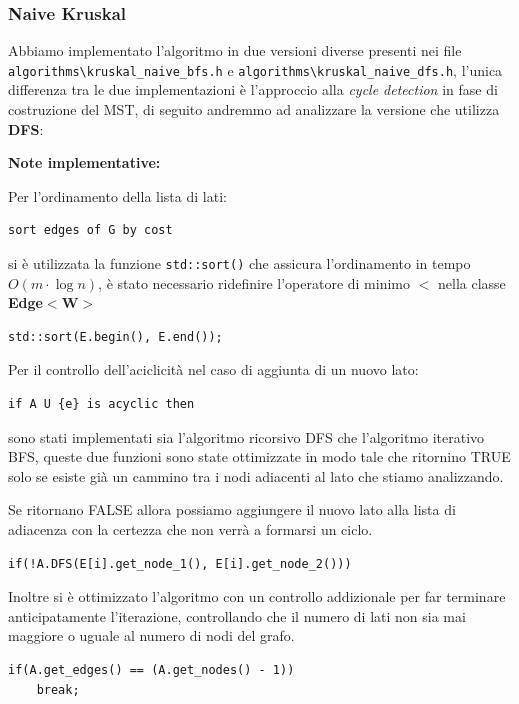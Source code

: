 \documentclass[]{article}
\begin{document}
\subsubsection{Naive Kruskal}
\begin{flushleft}
Abbiamo implementato l'algoritmo in due versioni diverse presenti nei file \verb|algorithms\kruskal_naive_bfs.h| e \verb|algorithms\kruskal_naive_dfs.h|, l'unica differenza tra le due implementazioni è l'approccio alla \textit{cycle detection} in fase di costruzione del MST, di seguito andremmo ad analizzare la versione che utilizza \textbf{DFS}:

\lstset{language=c++, style=mystyle}


\textbf{Note implementative:}

\medskip
Per l'ordinamento della lista di lati:

\begin{lstlisting}
sort edges of G by cost
\end{lstlisting}

\smallskip
si è utilizzata la funzione \verb|std::sort()| che assicura l'ordinamento in tempo $O(m\cdot\log n)$, è stato necessario ridefinire l'operatore di minimo \textbf{$<$} nella classe \textbf{Edge$<$W$>$}
 
\lstset{language=c++, style=mystyle, firstnumber=3} 	 	
\begin{lstlisting}
std::sort(E.begin(), E.end());
\end{lstlisting}

\medskip
Per il controllo dell'aciclicità nel caso di aggiunta di un nuovo lato:

\begin{lstlisting}
if A U {e} is acyclic then
\end{lstlisting}

\smallskip
sono stati implementati sia l'algoritmo ricorsivo DFS che l'algoritmo iterativo BFS, queste due funzioni sono state ottimizzate in modo tale che ritornino TRUE solo se esiste già un cammino tra i nodi adiacenti al lato che stiamo analizzando.

Se ritornano FALSE allora possiamo aggiungere il nuovo lato alla lista di adiacenza con la certezza che non verrà a formarsi un ciclo.

\lstset{language=c++, style=mystyle, firstnumber=5}
\begin{lstlisting}
if(!A.DFS(E[i].get_node_1(), E[i].get_node_2()))
\end{lstlisting}

\medskip
Inoltre si è ottimizzato l'algoritmo con un controllo addizionale per far terminare anticipatamente l'iterazione, controllando che il numero di lati non sia mai maggiore o uguale al numero di nodi del grafo.

\lstset{language=c++, style=mystyle, firstnumber=7}
\begin{lstlisting}
if(A.get_edges() == (A.get_nodes() - 1))
    break;
\end{lstlisting}
\end{flushleft}
\end{document}
